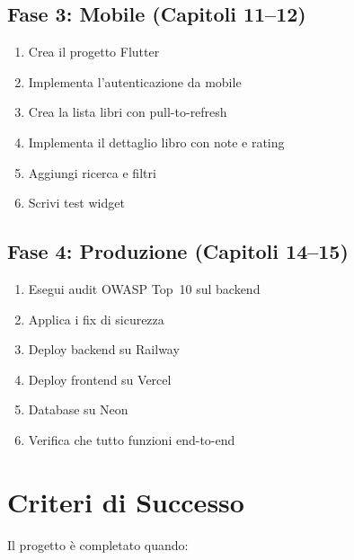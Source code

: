 \subsection{Fase 3: Mobile (Capitoli 11--12)}

\begin{enumerate}
  \item Crea il progetto Flutter
  \item Implementa l'autenticazione da mobile
  \item Crea la lista libri con pull-to-refresh
  \item Implementa il dettaglio libro con note e rating
  \item Aggiungi ricerca e filtri
  \item Scrivi test widget
\end{enumerate}

\subsection{Fase 4: Produzione (Capitoli 14--15)}

\begin{enumerate}
  \item Esegui audit OWASP Top~10 sul backend
  \item Applica i fix di sicurezza
  \item Deploy backend su Railway
  \item Deploy frontend su Vercel
  \item Database su Neon
  \item Verifica che tutto funzioni end-to-end
\end{enumerate}

\section{Criteri di Successo}

Il progetto è completato quando:

